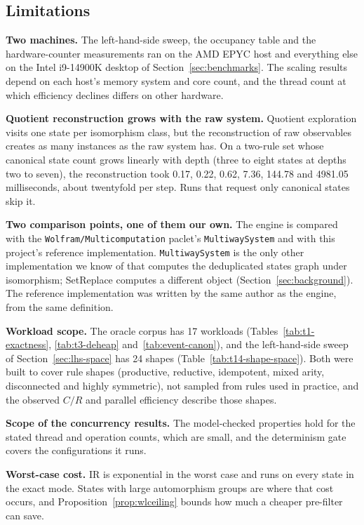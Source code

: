 \subsection{Limitations}
\label{sec:limitations}

\textbf{Two machines.} The left-hand-side sweep, the occupancy table and the hardware-counter
measurements ran on the AMD EPYC host and everything else on the Intel i9-14900K desktop of
Section~\ref{sec:benchmarks}. The scaling results depend on each host's memory system and core
count, and the thread count at which efficiency declines differs on other hardware.

\textbf{Quotient reconstruction grows with the raw system.} Quotient exploration visits one state
per isomorphism class, but the reconstruction of raw observables creates as many instances as the
raw system has. On a two-rule set whose canonical state count grows linearly with depth (three to
eight states at depths two to seven), the reconstruction took 0.17, 0.22, 0.62, 7.36, 144.78 and
4981.05 milliseconds, about twentyfold per step. Runs that request only canonical states skip it.

\textbf{Two comparison points, one of them our own.} The engine is compared with the
\texttt{Wolfram/\allowbreak Multicomputation} paclet's \texttt{MultiwaySystem} and with this
project's reference implementation. \texttt{MultiwaySystem} is the only other implementation we
know of that computes the deduplicated states graph under isomorphism; SetReplace computes a
different object (Section~\ref{sec:background}). The reference implementation was written by the
same author as the engine, from the same definition.

\textbf{Workload scope.} The oracle corpus has 17 workloads (Tables~\ref{tab:t1-exactness},
\ref{tab:t3-deheap} and~\ref{tab:event-canon}), and the left-hand-side sweep of
Section~\ref{sec:lhs-space} has 24 shapes (Table~\ref{tab:t14-shape-space}). Both were built to
cover rule shapes (productive, reductive, idempotent, mixed arity, disconnected and highly
symmetric), not sampled from rules used in practice, and the observed $C/R$ and parallel efficiency
describe those shapes.

\textbf{Scope of the concurrency results.} The model-checked properties hold for the stated thread
and operation counts, which are small, and the determinism gate covers the configurations it runs.

\textbf{Worst-case cost.} IR is exponential in the worst case and runs on every state in the exact
mode. States with large automorphism groups are where that cost occurs, and
Proposition~\ref{prop:wlceiling} bounds how much a cheaper pre-filter can save.

